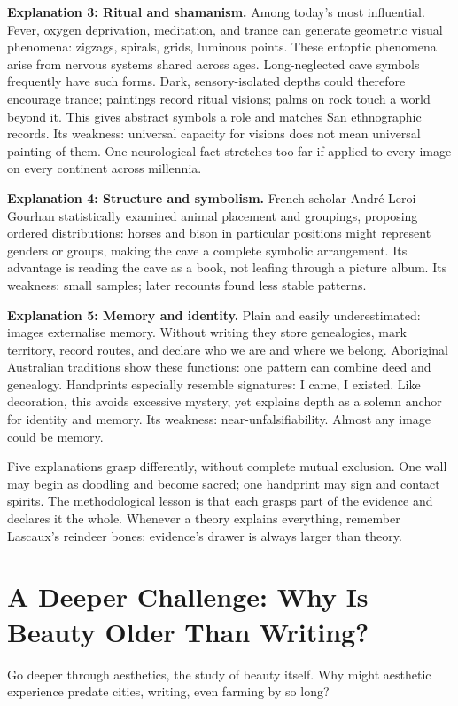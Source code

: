 \textbf{Explanation 3: Ritual and shamanism.} Among today's most influential. Fever, oxygen deprivation, meditation, and trance can generate geometric visual phenomena: zigzags, spirals, grids, luminous points. These entoptic phenomena arise from nervous systems shared across ages. Long-neglected cave symbols frequently have such forms. Dark, sensory-isolated depths could therefore encourage trance; paintings record ritual visions; palms on rock touch a world beyond it. This gives abstract symbols a role and matches San ethnographic records. Its weakness: universal capacity for visions does not mean universal painting of them. One neurological fact stretches too far if applied to every image on every continent across millennia.

\textbf{Explanation 4: Structure and symbolism.} French scholar André Leroi-Gourhan statistically examined animal placement and groupings, proposing ordered distributions: horses and bison in particular positions might represent genders or groups, making the cave a complete symbolic arrangement. Its advantage is reading the cave as a book, not leafing through a picture album. Its weakness: small samples; later recounts found less stable patterns.

\textbf{Explanation 5: Memory and identity.} Plain and easily underestimated: images externalise memory. Without writing they store genealogies, mark territory, record routes, and declare who we are and where we belong. Aboriginal Australian traditions show these functions: one pattern can combine deed and genealogy. Handprints especially resemble signatures: I came, I existed. Like decoration, this avoids excessive mystery, yet explains depth as a solemn anchor for identity and memory. Its weakness: near-unfalsifiability. Almost any image could be memory.

Five explanations grasp differently, without complete mutual exclusion. One wall may begin as doodling and become sacred; one handprint may sign and contact spirits. The methodological lesson is that each grasps part of the evidence and declares it the whole. Whenever a theory explains everything, remember Lascaux's reindeer bones: evidence's drawer is always larger than theory.

\section[Further Challenge: Beauty Before Writing]{A Deeper Challenge: Why Is Beauty Older Than Writing?}
Go deeper through aesthetics, the study of beauty itself. Why might aesthetic experience predate cities, writing, even farming by so long?

